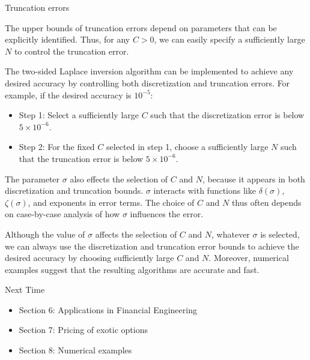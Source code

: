 \documentclass{beamer}
\begin{document}
\begin{frame}{Truncation errors}


    {\footnotesize \scriptsize
    \par The upper bounds of truncation errors depend on parameters that can be explicitly identified. Thus, for any \( C > 0 \),
     we can easily specify a sufficiently large \( N \) to control the truncation error.
    \par \pause  The two-sided Laplace inversion algorithm can be implemented to achieve any desired accuracy by controlling both discretization and truncation errors.
     For example, if the desired accuracy is \( 10^{-5} \):
     \begin{itemize}
        \item Step 1: Select a sufficiently large \( C \) such that the discretization error is below \( 5 \times 10^{-6} \).
        \item Step 2: For the fixed \( C \) selected in step 1, 
        choose a sufficiently large \( N \) such that the truncation error is below \( 5 \times 10^{-6} \).
     \end{itemize}
     \par  \pause  The parameter \(\sigma\) also effects the selection of \(C\) and \(N\), because it appears in both discretization and truncation bounds.
     \(\sigma\) interacts with functions like \(\delta(\sigma)\), \(\zeta(\sigma)\), and exponents in error terms.
     The choice of \(C\) and \(N\) thus often depends on case-by-case analysis of how \(\sigma\) influences the error.
     \par \pause  Although the value of \(\sigma\) affects the selection of \(C\) and \(N\), whatever \(\sigma\) is selected, 
     we can always use the discretization and truncation error bounds to achieve the desired accuracy by choosing sufficiently large \(C\) and \(N\). 
     Moreover, numerical examples suggest that the resulting algorithms are accurate and fast.
    }
    
\end{frame}
\begin{frame}{Next Time}

    {\footnotesize \footnotesize
    \begin{itemize}
        \item Section 6: Applications in Financial Engineering
        \item Section 7: Pricing of exotic options
        \item Section 8: Numerical examples
    \end{itemize}
    }
    
\end{frame}
%
%
%
%


    
\end{document}
